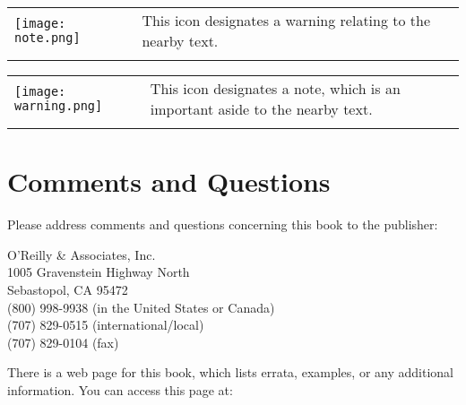 
\begin{table}[h]
  \begin{center}
    \begin{tabu} to 0.85\linewidth {|X[1,r,m]X[15,l,m]|}
      \tabucline{-}
      \texttt{[image: note.png]} & This icon designates a warning relating to the nearby text.\\
      \tabucline{-}
    \end{tabu}
  \end{center}
\end{table}
\vspace{-25pt}

\begin{table}[h]
  \begin{center}
    \begin{tabu} to 0.85\linewidth {|X[1,r,m]X[15,l,m]|}
      \tabucline{-}
      \texttt{[image: warning.png]} & This icon designates a note, which is an important aside to the nearby text.\\
      \tabucline{-}
    \end{tabu}
  \end{center}
\end{table}
\vspace{-25pt}

\section*{Comments and Questions}
Please address comments and questions concerning this book to the publisher:

O'Reilly \& Associates, Inc.\\
1005 Gravenstein Highway North\\
Sebastopol, CA 95472\\
(800) 998-9938 (in the United States or Canada)\\
(707) 829-0515 (international/local)\\
(707) 829-0104 (fax)

There is a web page for this book, which lists errata, examples, or any additional information. You can access this page at:

